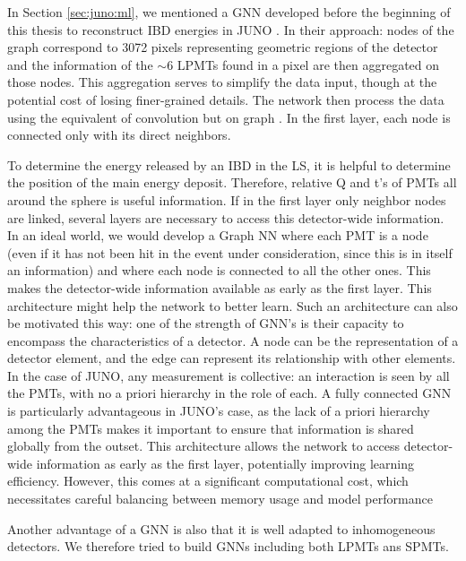 \documentclass[../main.tex]{subfiles}
\begin{document}
In Section \ref{sec:juno:ml}, we mentioned a GNN developed before the beginning of this thesis to reconstruct IBD energies in JUNO \cite{qian_vertex_2021}. In their approach:
nodes of the graph correspond to 3072 pixels representing geometric regions of the detector and the information of the $\sim6$ LPMTs found in a pixel are then aggregated on those nodes. This aggregation serves to simplify the data input, though at the potential cost of losing finer-grained details.
The network then process the data using the equivalent of convolution but on graph \cite{defferrard_convolutional_2017}. In the first layer, each node is connected only with its direct neighbors.

To determine the energy released by an IBD in the LS, it is helpful to determine the position of the main energy deposit. Therefore, relative Q and t's of PMTs all around the sphere is useful information. If in the first layer only neighbor nodes are linked, several layers are necessary to access this detector-wide information. In an ideal world, we would develop a Graph NN where each PMT is a node
(even if it has not been hit in the event under consideration, since this is in itself an information) and where each node is connected to all the other ones. This makes the detector-wide information available as early as the first layer. This architecture
might help the network to better learn. Such an architecture can also be motivated this way: one of the strength of GNN's is their capacity to encompass the characteristics of a detector.
A node can be the representation of a detector element, and the edge can represent its relationship with other elements. In the case of JUNO, any measurement is collective: an interaction is seen by all the PMTs, with no a priori hierarchy in the role of each.
A fully connected GNN is particularly advantageous in JUNO's case, as the lack of a priori hierarchy among the PMTs makes it important to ensure that information is shared globally from the outset. This architecture allows the network to access detector-wide information as early as the first layer, potentially improving learning efficiency. However, this comes at a significant computational cost, which necessitates careful balancing between memory usage and model performance

Another advantage of a GNN is also that it is well adapted to inhomogeneous detectors.
We therefore tried to build GNNs including both LPMTs ans SPMTs.
\end{document}
